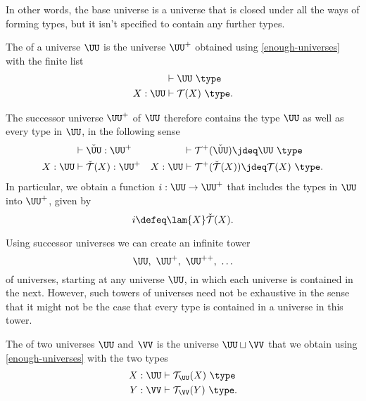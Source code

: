 In other words, the base universe is a universe that is closed under all the ways of forming types, but it isn't specified to contain any further types.

\begin{defn}\label{defn:successor-universe}
  The  of a universe $\UU$ is the universe $\UU^+$ obtained using \cref{enough-universes} with the finite list
  \begin{align*}
    & \vdash \UU~\type \\
    X:\UU & \vdash \mathcal{T}(X)~\type.
  \end{align*}
\end{defn}

\begin{rmk}\label{rmk:successor-universe}
  The successor universe $\UU^+$ of $\UU$ therefore contains the type $\UU$ as well as every type in $\UU$, in the following sense
  \begin{align*}
    & \vdash \check{\UU}:\UU^+ & & \vdash \mathcal{T}^+(\check{\UU})\jdeq\UU~\type \\
    X:\UU & \vdash \check{\mathcal{T}}(X) :\UU^+ & X:\UU & \vdash \mathcal{T}^+(\check{\mathcal{T}}(X))\jdeq \mathcal{T}(X)~\type.
  \end{align*}
  In particular, we obtain a function $i:\UU\to\UU^+$ that includes the types in $\UU$ into $\UU^+$, given by
  \begin{equation*}
    i\defeq \lam{X}\check{\mathcal{T}}(X).
  \end{equation*}

  Using successor universes we can create an infinite tower
  \begin{equation*}
    \UU,\ \UU^+,\ \UU^{++},\ \ldots
  \end{equation*}
  of universes, starting at any universe $\UU$, in which each universe is contained in the next. However, such towers of universes need not be exhaustive in the sense that it might not be the case that every type is contained in a universe in this tower.
\end{rmk}

\begin{defn}\label{defn:join-universe}
  The  of two universes $\UU$ and $\VV$ is the universe $\UU\sqcup\VV$ that we obtain using \cref{enough-universes} with the two types
  \begin{align*}
    X:\UU & \vdash \mathcal{T}_{\UU}(X)~\type \\
    Y:\VV & \vdash \mathcal{T}_{\VV}(Y) ~\type.
  \end{align*}
\end{defn}

